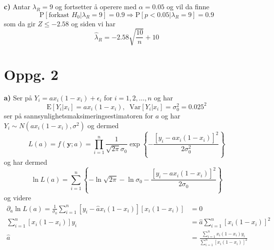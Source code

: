 \documentclass{report}
\newcommand{\bbrack}[1]{\left[ #1 \right]}
\newcommand{\cbrack}[1]{\left\lbrace #1 \right\rbrace}
\newcommand{\Var}[1]{\text{Var} \bbrack{ #1 }}
\newcommand{\fvv}[1]{\text{E} \bbrack{ #1 }}
\newcommand{\Prob}[1]{\text{P} \bbrack{ #1 }}
\begin{document}
\textbf{c)}
Antar $\lambda_{R} = 9$ og fortsetter å operere med $\alpha = 0.05$ og vil da finne
\begin{equation}
  \label{eq:48}
  \Prob{ \text{forkast } H_{0} | \lambda_{R} = 9} = 0.9 \Rightarrow \Prob{ p < 0.05 | \lambda_{R} = 9} = 0.9
\end{equation}
som da gir $Z \leq -2.58$ og siden vi har
\begin{equation}
  \label{eq:50}
  \widehat{\lambda}_{R} = -2.58\sqrt{\frac{10}{n}} + 10
\end{equation}

\section*{Oppg. 2}
\textbf{a)}
Ser på $Y_{i} = ax_{i}(1-x_{i}) + \epsilon_{i}$ for $i = 1, 2, \dots, n$ og har
\begin{equation}
  \label{eq:14}
  \fvv{ Y_{i} | x_{i} } = ax_{i} (1-x_{i}), \;\; \Var{ Y_{i} | x_{i} } = \sigma_{0}^{2} = 0.025^{2}
\end{equation}
ser på sannsynlighetsmaksimeringsestimatoren for $a$ og har $Y_{i} \sim N(ax_{i} (1-x_{i}), \sigma^{2})$ og dermed
\begin{equation}
  \label{eq:15}
  L(a) = f(\mathbf{y};a) = \prod_{i=1}^{n} \frac{1}{\sqrt{2\pi}\sigma_{0}} \exp\cbrack{ -\frac{ \bbrack{ y_{i} - ax_{i} (1-x_{i}) }^{2} }{ 2\sigma_{0}^{2} } }
\end{equation}
og har dermed
\begin{equation}
  \label{eq:10}
  \ln L(a) = \sum_{i=1}^{n} \cbrack{ -\ln \sqrt{2\pi} - \ln \sigma_{0} - \frac{\bbrack{ y_{i} - ax_{i}(1-x_{i}) }^{2}}{2\sigma_{0}} }
\end{equation}
og videre
\begin{equation}
  \label{eq:16}
  \begin{split}
    \partial_{a}\ln L(a) = \frac{1}{\sigma_{0}}\sum_{i=1}^{n} \bbrack{ y_{i} - \widehat{a}x_{i}(1-x_{i}) } \bbrack{x_{i}(1-x_{i})} &= 0 \\
    \sum_{i=1}^{n}\bbrack{x_{i}(1-x_{i})}y_{i} &= \widehat{a}\sum_{i=1}^{n} \bbrack{ x_{i} (1-x_{i}) }^{2} \\
    \widehat{a} &= \frac{\sum_{i=1}^{n} x_{i}(1 - x_{i})y_{i} }{ \sum_{i=1}^{n} \bbrack{ x_{i} (1-x_{i}) }^{2} }
  \end{split}
\end{equation}
\end{document}
